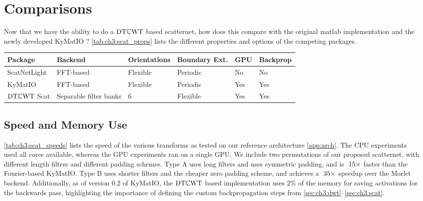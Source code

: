 \section{Comparisons}
Now that we have the ability to do a $\mathrm{DT}\mathbb{C}\mathrm{WT}$ based scatternet, how does this
compare with the original matlab implementation \cite{oyallon_deep_2015} and the newly developed
KyMatIO \cite{andreux_kymatio:_2018}? \autoref{tab:ch3:scat_props} lists the different properties and 
options of the competing packages. 

\begin{table}
  \centering
  {\renewcommand{\arraystretch}{1.2}
  \begin{tabular}{@{}llllll}
    \toprule
    Package & Backend & Orientations & Boundary Ext. & GPU & Backprop \\\midrule
    ScatNetLight\cite{oyallon_deep_2015} & {FFT-based} & Flexible & Periodic & No & No \\
    KyMatIO\cite{andreux_kymatio:_2018} & {FFT-based}& Flexible & Periodic & Yes & Yes \\
    $\mathrm{DT}\mathbb{C}\mathrm{WT}$ Scat & {Separable filter banks} & 6 & Flexible & Yes & Yes \\
    \bottomrule
  \end{tabular}\label{tab:ch3:scat_props}
  }
\end{table}

\subsection{Speed and Memory Use}
\autoref{tab:ch3:scat_speeds} lists the speed of the various transforms as
tested on our reference architecture \autoref{app:arch}. The CPU experiments
used all cores available, whereas the GPU experiments ran on a single GPU\@. We
include two permutations of our proposed scatternet, with different length
filters and different padding schemes. Type A uses long filters and uses
symmetric padding, and is $~15\times$ faster than the Fourier-based KyMatIO\@. Type B
uses shorter filters and the cheaper zero padding scheme, and 
achieves a $~35\times$ speedup over the Morlet backend.
Additionally, as of version 0.2 of KyMatIO, the $\mathrm{DT}\mathbb{C}\mathrm{WT}$ based implementation
uses $2\%$ of the memory for saving activations for the
backwards pass, highlighting the importance of defining the custom
backpropagation steps from \autoref{sec:ch3:dwt}--\autoref{sec:ch3:scat}.

